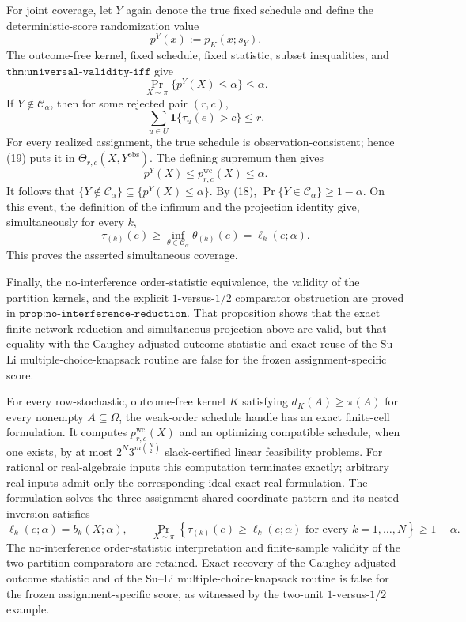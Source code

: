 For joint coverage, let \(Y\) again denote the true fixed schedule and define the deterministic-score randomization value
\[
 p^Y(x):=p_K(x;s_Y).
\tag{17}
\]
The outcome-free kernel, fixed schedule, fixed statistic, subset inequalities, and \(\texttt{thm:universal-validity-iff}\) give
\[
 \Pr_{X\sim\pi}\{p^Y(X)\leq\alpha\}\leq\alpha.
\tag{18}
\]
If \(Y\notin\mathcal C_\alpha\), then for some rejected pair \((r,c)\),
\[
 \sum_{u\in U}\mathbf 1\{\tau_u(e)>c\}\leq r.
\tag{19}
\]
For every realized assignment, the true schedule is observation-consistent; hence (19) puts it in \(\Theta_{r,c}(X,Y^{\mathrm{obs}})\).  The defining supremum then gives
\[
 p^Y(X)\leq p^{\mathrm{wc}}_{r,c}(X)\leq\alpha.
\tag{20}
\]
It follows that \(\{Y\notin\mathcal C_\alpha\}\subseteq\{p^Y(X)\leq\alpha\}\).  By (18), \(\Pr\{Y\in\mathcal C_\alpha\}\geq1-\alpha\).  On this event, the definition of the infimum and the projection identity give, simultaneously for every \(k\),
\[
 \tau_{(k)}(e)
 \geq\inf_{\theta\in\mathcal C_\alpha}\theta_{(k)}(e)
 =\ell_k(e;\alpha).
\tag{21}
\]
This proves the asserted simultaneous coverage.

Finally, the no-interference order-statistic equivalence, the validity of the partition kernels, and the explicit \(1\)-versus-\(1/2\) comparator obstruction are proved in \(\texttt{prop:no-interference-reduction}\).  That proposition shows that the exact finite network reduction and simultaneous projection above are valid, but that equality with the Caughey adjusted-outcome statistic and exact reuse of the Su--Li multiple-choice-knapsack routine are false for the frozen assignment-specific score.

For every row-stochastic, outcome-free kernel \(K\) satisfying \(d_K(A)\geq\pi(A)\) for every nonempty \(A\subseteq\Omega\), the weak-order schedule handle has an exact finite-cell formulation.  It computes \(p^{\mathrm{wc}}_{r,c}(X)\) and an optimizing compatible schedule, when one exists, by at most \(2^N3^{m\binom N2}\) slack-certified linear feasibility problems.  For rational or real-algebraic inputs this computation terminates exactly; arbitrary real inputs admit only the corresponding ideal exact-real formulation.  The formulation solves the three-assignment shared-coordinate pattern and its nested inversion satisfies
\[
 \ell_k(e;\alpha)=b_k(X;\alpha),
 \qquad
 \Pr_{X\sim\pi}\!\left\{\tau_{(k)}(e)\geq\ell_k(e;\alpha)
 \text{ for every }k=1,\ldots,N\right\}\geq1-\alpha.
\]
The no-interference order-statistic interpretation and finite-sample validity of the two partition comparators are retained.  Exact recovery of the Caughey adjusted-outcome statistic and of the Su--Li multiple-choice-knapsack routine is false for the frozen assignment-specific score, as witnessed by the two-unit \(1\)-versus-\(1/2\) example.

